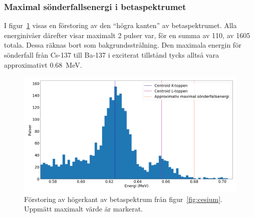 \subsubsection{Maximal sönderfallsenergi i betaspektrumet}

I figur~\ref{fig:cesiummax} visas en förstoring av den ``högra kanten'' av
betaspektrumet. Alla energinivåer därefter visar maximalt \num{2} pulser var,
för en summa av 110, av \num{1605} totala. Dessa räknas bort som
bakgrundsstrålning. Den maximala energin för sönderfall från Cs-137 till Ba-137
i exciterat tillstånd tycks alltså vara approximativt \qty{0.68}{\MeV}.

\begin{figure}[!ht]
    \centering
    \includegraphics[width=\textwidth, keepaspectratio]{../images/cesium_max.png}
    \caption{
        Förstoring av högerkant av betaspektrum från figur~\ref{fig:cesium}.
        Uppmätt maximalt värde är markerat.
    }
    \label{fig:cesiummax}
\end{figure}
